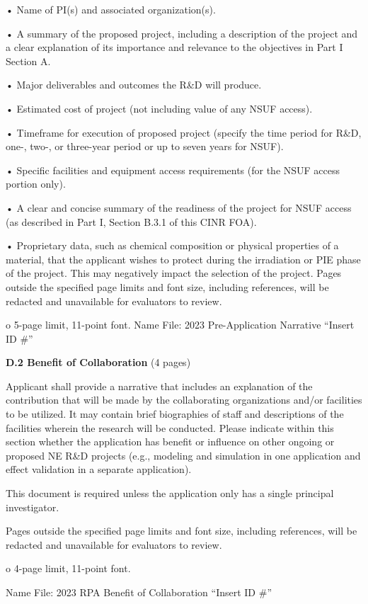• Name of PI(s) and associated organization(s).

• A summary of the proposed project, including a description of the project and
a clear explanation of its importance and relevance to the objectives in Part I
Section A.

• Major deliverables and outcomes the R\&D will produce.

• Estimated cost of project (not including value of any NSUF access).

• Timeframe for execution of proposed project (specify the time period for R\&D,
one-, two-, or three-year period or up to seven years for NSUF).

• Specific facilities and equipment access requirements (for the NSUF access portion only).

• A clear and concise summary of the readiness of the project for NSUF access
(as described in Part I, Section B.3.1 of this CINR FOA).

• Proprietary data, such as chemical composition or physical properties of a
material, that the applicant wishes to protect during the irradiation or PIE
phase of the project. This may negatively impact the selection of the project.
Pages outside the specified page limits and font size, including references,
will be redacted and unavailable for evaluators to review.

o 5-page limit, 11-point font.  Name File: 2023 Pre-Application Narrative
“Insert ID \#”

{\bf D.2 Benefit of Collaboration} (4 pages)

Applicant shall provide a narrative that includes an explanation of the
contribution that will be made by the collaborating organizations and/or
facilities to be utilized. It may contain brief biographies of staff and
descriptions of the facilities wherein the research will be conducted. Please
indicate within this section whether the application has benefit or influence
on other ongoing or proposed NE R\&D projects (e.g., modeling and simulation in
one application and effect validation in a separate application).

This document is required unless the application only has a single principal
investigator.

Pages outside the specified page limits and font size, including references,
will be redacted and unavailable for evaluators to review.

o 4-page limit, 11-point font.

Name File: 2023 RPA Benefit of Collaboration “Insert ID \#”

